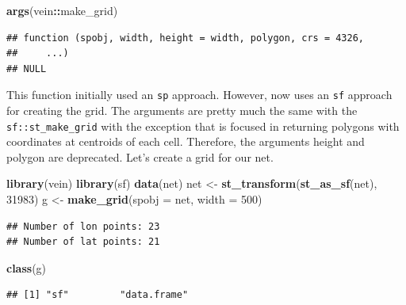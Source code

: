 \documentclass[12pt,graybox,envcountchap,sectrefs]{krantz}
\makeatletter
\newenvironment{Shaded}{\begin{snugshade}}{\end{snugshade}}
\newcommand{\KeywordTok}[1]{\textcolor[rgb]{0.13,0.29,0.53}{\textbf{#1}}}
\newcommand{\DataTypeTok}[1]{\textcolor[rgb]{0.13,0.29,0.53}{#1}}
\newcommand{\DecValTok}[1]{\textcolor[rgb]{0.00,0.00,0.81}{#1}}
\newcommand{\StringTok}[1]{\textcolor[rgb]{0.31,0.60,0.02}{#1}}
\newcommand{\OtherTok}[1]{\textcolor[rgb]{0.56,0.35,0.01}{#1}}
\newcommand{\OperatorTok}[1]{\textcolor[rgb]{0.81,0.36,0.00}{\textbf{#1}}}
\newcommand{\NormalTok}[1]{#1}
\newenvironment{kframe}{%
\medskip{}
\setlength{\fboxsep}{.8em}
 \def\at@end@of@kframe{}%
 \ifinner\ifhmode%
  \def\at@end@of@kframe{\end{minipage}}%
  \begin{minipage}{\columnwidth}%
 \fi\fi%
 \def\FrameCommand##1{\hskip\@totalleftmargin \hskip-\fboxsep
 \colorbox{shadecolor}{##1}\hskip-\fboxsep
     \hskip-\linewidth \hskip-\@totalleftmargin \hskip\columnwidth}%
 \MakeFramed {\advance\hsize-\width
   \@totalleftmargin\z@ \linewidth\hsize
   \@setminipage}}%
 {\par\unskip\endMakeFramed%
 \at@end@of@kframe}
\renewenvironment{Shaded}{\begin{kframe}}{\end{kframe}}
\theoremstyle{definition}
\theoremstyle{definition}
\theoremstyle{definition}
\theoremstyle{remark}
\makeatother
\begin{document}
\begin{Shaded}
\begin{Highlighting}[]
\KeywordTok{args}\NormalTok{(vein}\OperatorTok{::}\NormalTok{make_grid)}
\end{Highlighting}
\end{Shaded}

\begin{verbatim}
## function (spobj, width, height = width, polygon, crs = 4326, 
##     ...) 
## NULL
\end{verbatim}

This function initially used an \texttt{sp} approach. However, now uses
an \texttt{sf} approach for creating the grid. The arguments are pretty
much the same with the \texttt{sf::st\_make\_grid} with the exception
that is focused in returning polygons with coordinates at centroids of
each cell. Therefore, the arguments height and polygon are deprecated.
Let's create a grid for our net.

\begin{Shaded}
\begin{Highlighting}[]
\KeywordTok{library}\NormalTok{(vein)}
\KeywordTok{library}\NormalTok{(sf)}
\KeywordTok{data}\NormalTok{(net)}
\NormalTok{net <-}\StringTok{ }\KeywordTok{st_transform}\NormalTok{(}\KeywordTok{st_as_sf}\NormalTok{(net), }\DecValTok{31983}\NormalTok{)}
\NormalTok{g <-}\StringTok{ }\KeywordTok{make_grid}\NormalTok{(}\DataTypeTok{spobj =}\NormalTok{ net, }\DataTypeTok{width =} \DecValTok{500}\NormalTok{)}
\end{Highlighting}
\end{Shaded}

\begin{verbatim}
## Number of lon points: 23
## Number of lat points: 21
\end{verbatim}

\begin{Shaded}
\begin{Highlighting}[]
\KeywordTok{class}\NormalTok{(g)}
\end{Highlighting}
\end{Shaded}

\begin{verbatim}
## [1] "sf"         "data.frame"
\end{verbatim}

\begin{Shaded}
\end{Shaded}
\end{document}
